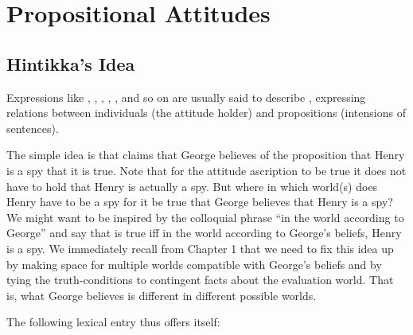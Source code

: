 \chapter{Propositional Attitudes}\label{cha:propositional_attitudes} %


\minitoc

\section{Hintikka's Idea} \label{sec:hintikkas-idea}

Expressions %
%
like , , ,
, , and so on are usually said to describe
, expressing relations between individuals (the
attitude holder) and propositions (intensions of sentences).

The simple idea is that  claims
that George believes of the proposition that Henry is a spy that it is true. %
%
Note that for the attitude ascription to be true it does not have to hold that
Henry is actually a spy. But where \dash in which world(s) \dash does Henry have
to be a spy for it be true that George believes that Henry is a spy? We might
want to be inspired by the colloquial phrase ``in the world according to
George'' and say that  is true
iff in the world according to George's beliefs, Henry is a spy. We immediately
recall from Chapter 1 that we need to fix this idea up by making space for
multiple worlds compatible with George's beliefs and by tying the
truth-conditions to contingent facts about the evaluation world. That is, what
George believes is different in different possible worlds.

\clearpage The following lexical entry thus offers itself:

